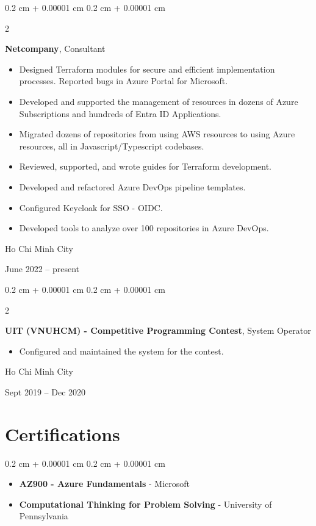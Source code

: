 \documentclass[10pt, a4paper]{article}
\newenvironment{highlights}{
    \begin{itemize}[
        topsep=0.10 cm,
        parsep=0.10 cm,
        partopsep=0pt,
        itemsep=0pt,
        leftmargin=0.4 cm + 10pt
    ]
}{
    \end{itemize}
} %
\newenvironment{highlightsforbulletentries}{
    \begin{itemize}[
        topsep=0.10 cm,
        parsep=0.10 cm,
        partopsep=0pt,
        itemsep=0pt,
        leftmargin=10pt
    ]
}{
    \end{itemize}
} %
\newenvironment{onecolentry}{
    \begin{adjustwidth}{
        0.2 cm + 0.00001 cm
    }{
        0.2 cm + 0.00001 cm
    }
}{
    \end{adjustwidth}
} %
\newenvironment{twocolentry}[2][]{
    \onecolentry
    \def\secondColumn{#2}
    \setcolumnwidth{\fill, 4.5 cm}
    \begin{paracol}{2}
}{
    \switchcolumn \raggedleft \secondColumn
    \end{paracol}
    \endonecolentry
} %
\begin{document}
        
        \begin{twocolentry}{
            Ho Chi Minh City

        June 2022 – present
        }
            \textbf{Netcompany}, Consultant
            \begin{highlights}
                \item Designed Terraform modules for secure and efficient implementation processes. Reported bugs in Azure Portal for Microsoft.
                \item Developed and supported the management of resources in dozens of Azure Subscriptions and hundreds of Entra ID Applications.
                \item Migrated dozens of repositories from using AWS resources to using Azure resources, all in Javascript/Typescript codebases.
                \item Reviewed, supported, and wrote guides for Terraform development.
                \item Developed and refactored Azure DevOps pipeline templates.
                \item Configured Keycloak for SSO - OIDC.
                \item Developed tools to analyze over 100 repositories in Azure DevOps.
            \end{highlights}
        \end{twocolentry}


        \vspace{0.2 cm}

        \begin{twocolentry}{
            Ho Chi Minh City

        Sept 2019 – Dec 2020
        }
            \textbf{UIT (VNUHCM) - Competitive Programming Contest}, System Operator
            \begin{highlights}
                \item Configured and maintained the system for the contest.
            \end{highlights}
        \end{twocolentry}



    
    \section{Certifications}

    \begin{onecolentry}
        \begin{highlightsforbulletentries}


        \item \textbf{AZ900 - Azure Fundamentals} - Microsoft

        \item \textbf{Computational Thinking for Problem Solving} - University of Pennsylvania


        \end{highlightsforbulletentries}
    \end{onecolentry}
\end{document}
